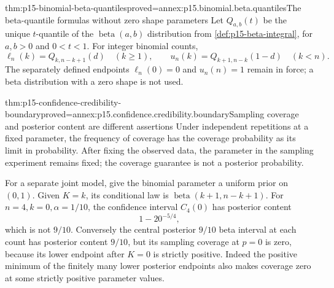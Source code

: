 \begin{hbtheorem}{thm:p15-binomial-beta-quantiles}{proved=annex:p15.binomial.beta.quantiles}{The beta-quantile formulas without zero shape parameters}
Let \(Q_{a,b}(t)\) be the unique \(t\)-quantile of the
\(\operatorname{beta}(a,b)\) distribution from
\cref{def:p15-beta-integral}, for \(a,b>0\) and \(0<t<1\).
For integer binomial counts,
\[
 \ell_n(k)=Q_{k,n-k+1}(d)\quad(k\geq1),\qquad
 u_n(k)=Q_{k+1,n-k}(1-d)\quad(k<n).
\]
The separately defined endpoints \(\ell_n(0)=0\) and
\(u_n(n)=1\) remain in force; a beta distribution with
a zero shape is not used.
\end{hbtheorem}

\begin{hbtheorem}{thm:p15-confidence-credibility-boundary}{proved=annex:p15.confidence.credibility.boundary}{Sampling coverage and posterior content are different assertions}
Under independent repetitions at a fixed parameter,
the frequency of coverage has the coverage probability
as its limit in probability. After fixing the observed
data, the parameter in the sampling experiment remains
fixed; the coverage guarantee is not a posterior probability.

For a separate joint model, give the binomial parameter
a uniform prior on \((0,1)\). Given \(K=k\), its conditional
law is \(\operatorname{beta}(k+1,n-k+1)\).
For \(n=4,k=0,\alpha=1/10\), the confidence interval
\(C_4(0)\) has posterior content
\[
                              1-20^{-5/4},
\]
which is not \(9/10\).
Conversely the central posterior \(9/10\) beta interval
at each count has posterior content \(9/10\), but its
sampling coverage at \(p=0\) is zero, because its lower
endpoint after \(K=0\) is strictly positive.
Indeed the positive minimum of the finitely many lower
posterior endpoints also makes coverage zero at some
strictly positive parameter values.
\end{hbtheorem}
